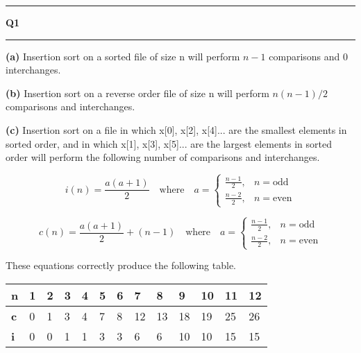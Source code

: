 \documentclass[11pt]{article}
\newcommand\question[2]{\vspace{.25in}\hrule\textbf{#1 #2}\vspace{.5em}\hrule\vspace{.10in}}
\renewcommand\part[1]{\vspace{.10in}\textbf{(#1)}}
\begin{document}
\raggedright
\newcommand\NAME{Sean Connor}  %
\newcommand\HWNUM{8}              %

\question{Q1}{}
\part{a} Insertion sort on a sorted file of size n will perform $n-1$ comparisons and 0 interchanges.

\part{b} Insertion sort on a reverse order file of size n will perform $n(n-1)/2$ comparisons and interchanges.

\part{c} Insertion sort on a file in which x[0], x[2], x[4]... are the smallest elements in sorted order, and in which x[1],
x[3], x[5]... are the largest elements in sorted order will perform the following number of comparisons and interchanges.

\[
    i(n) = \frac{a(a+1)}{2} \quad \text{where} \quad a = 
\begin{cases}
    \frac{n-1}{2},& n = \text{odd}\\
    \frac{n-2}{2},& n = \text{even}
\end{cases}
\]

\[
    c(n) = \frac{a(a+1)}{2} + (n-1) \quad \text{where} \quad a = 
\begin{cases}
    \frac{n-1}{2},& n = \text{odd}\\
    \frac{n-2}{2},& n = \text{even}
\end{cases}
\]

These equations correctly produce the following table.

\begin{table}[!htbp]
\centering
\begin{tabular}{|l|l|l|l|l|l|l|l|l|l|l|l|l|}
\hline
\textbf{n} & 1 & 2 & 3 & 4 & 5 & 6 & 7  & 8  & 9  & 10 & 11 & 12 \\ \hline
\textbf{c} & 0 & 1 & 3 & 4 & 7 & 8 & 12 & 13 & 18 & 19 & 25 & 26 \\ \hline
\textbf{i} & 0 & 0 & 1 & 1 & 3 & 3 & 6  & 6  & 10 & 10 & 15 & 15 \\ \hline
\end{tabular}
\end{table}
\end{document}
